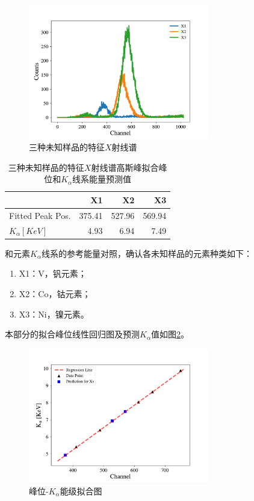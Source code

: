 \documentclass{article}
\begin{document}
    \begin{figure}[htbp]
        \centering
        \includegraphics[width=0.7\textwidth]{../plot/Prediction.pdf}
        \caption{三种未知样品的特征$X$射线谱\label{fig:Prediction}}
    \end{figure}
    \begin{table}[htbp]
        \centering
        \caption{三种未知样品的特征$X$射线谱高斯峰拟合峰位和$K_\alpha$线系能量预测值\label{tab:Prediction}}
        \begin{tabular}{lrrr}
            \toprule
            {} &          X1 &          X2 &          X3 \\
            \midrule
            Fitted Peak Pos. &  375.41 &  527.96 &  569.94 \\
            $K_\alpha[\si{KeV}]$ &    4.93 &    6.94 &    7.49 \\
            \bottomrule
            \end{tabular}
            
    \end{table}
    和元素$K_\alpha$线系的参考能量对照，确认各未知样品的元素种类如下：
    \begin{enumerate}
        \item X1：V，钒元素；
        \item X2：Co，钴元素；
        \item X3：Ni，镍元素。
    \end{enumerate} 
    本部分的拟合峰位线性回归图及预测$K_\alpha$值如图\ref{fig:LinearReg1}。
    \begin{figure}[htbp]
        \centering
        \includegraphics[width=0.7\textwidth]{../plot/LinearReg1.pdf}
        \caption{峰位-$K_\alpha$能级拟合图\label{fig:LinearReg1}}
    \end{figure}
\end{document}
